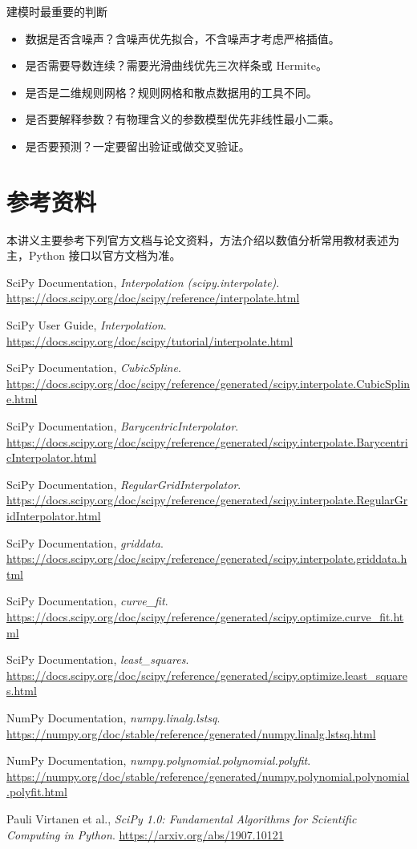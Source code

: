 \documentclass[11pt,a4paper]{ctexart}
\begin{document}
\begin{keybox}{建模时最重要的判断}
\begin{itemize}
  \item 数据是否含噪声？含噪声优先拟合，不含噪声才考虑严格插值。
  \item 是否需要导数连续？需要光滑曲线优先三次样条或 Hermite。
  \item 是否是二维规则网格？规则网格和散点数据用的工具不同。
  \item 是否要解释参数？有物理含义的参数模型优先非线性最小二乘。
  \item 是否要预测？一定要留出验证或做交叉验证。
\end{itemize}
\end{keybox}

\section{参考资料}

本讲义主要参考下列官方文档与论文资料，方法介绍以数值分析常用教材表述为主，Python 接口以官方文档为准。

\begin{enumerate}[label={[\arabic*]}]
  \item SciPy Documentation, \emph{Interpolation (scipy.interpolate)}. \url{https://docs.scipy.org/doc/scipy/reference/interpolate.html}
  \item SciPy User Guide, \emph{Interpolation}. \url{https://docs.scipy.org/doc/scipy/tutorial/interpolate.html}
  \item SciPy Documentation, \emph{CubicSpline}. \url{https://docs.scipy.org/doc/scipy/reference/generated/scipy.interpolate.CubicSpline.html}
  \item SciPy Documentation, \emph{BarycentricInterpolator}. \url{https://docs.scipy.org/doc/scipy/reference/generated/scipy.interpolate.BarycentricInterpolator.html}
  \item SciPy Documentation, \emph{RegularGridInterpolator}. \url{https://docs.scipy.org/doc/scipy/reference/generated/scipy.interpolate.RegularGridInterpolator.html}
  \item SciPy Documentation, \emph{griddata}. \url{https://docs.scipy.org/doc/scipy/reference/generated/scipy.interpolate.griddata.html}
  \item SciPy Documentation, \emph{curve\_fit}. \url{https://docs.scipy.org/doc/scipy/reference/generated/scipy.optimize.curve_fit.html}
  \item SciPy Documentation, \emph{least\_squares}. \url{https://docs.scipy.org/doc/scipy/reference/generated/scipy.optimize.least_squares.html}
  \item NumPy Documentation, \emph{numpy.linalg.lstsq}. \url{https://numpy.org/doc/stable/reference/generated/numpy.linalg.lstsq.html}
  \item NumPy Documentation, \emph{numpy.polynomial.polynomial.polyfit}. \url{https://numpy.org/doc/stable/reference/generated/numpy.polynomial.polynomial.polyfit.html}
  \item Pauli Virtanen et al., \emph{SciPy 1.0: Fundamental Algorithms for Scientific Computing in Python}. \url{https://arxiv.org/abs/1907.10121}
\end{enumerate}
\end{document}
